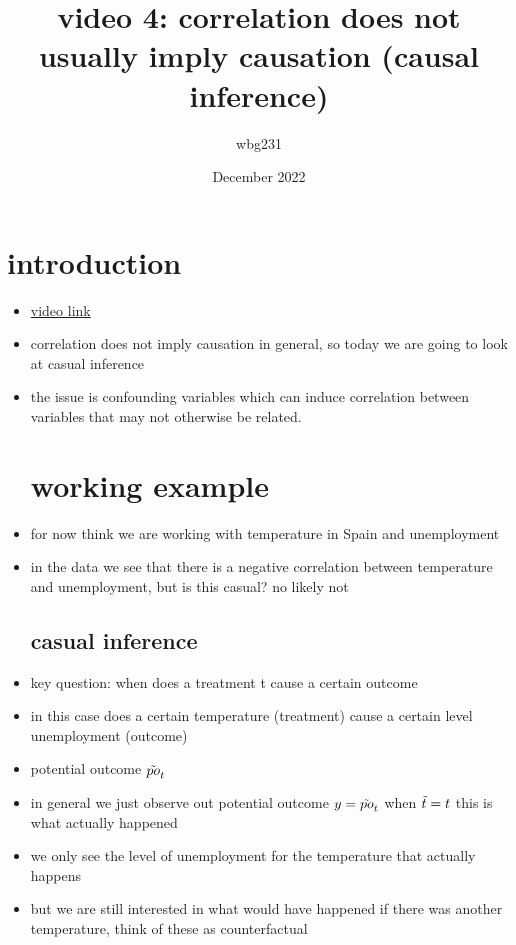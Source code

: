 \documentclass{article}
\title{video 4: correlation does not usually imply causation (causal inference)}
\author{wbg231 }
\date{December 2022}
\begin{document}
\maketitle

\section{introduction}
\begin{itemize}
\item \href{https://www.youtube.com/watch?v=dVAGPmiF3E0}{video link}
\item correlation does not imply causation in general, so today we are going to look at casual inference 
\item the issue is confounding variables which can induce correlation between variables that may not otherwise be related. 
\section{working example}
\item for now think we are working with temperature in Spain and unemployment 
\item in the data we see that there is a negative correlation between temperature and unemployment, but is this casual? no likely not
\subsection{ casual inference}
\item key question: when does a treatment t cause a certain outcome
\item in this case does a certain temperature (treatment) cause a certain level unemployment (outcome)
\item potential outcome $\Tilde{po}_{t}$
\item in general we just observe out potential outcome $y=\Tilde{po}_{t}$ when $\Tilde{t}=t$ this is what actually happened 
\item we only see the level of unemployment for the temperature that actually happens 
\item but we are still interested in what would have happened if there was another temperature, think of these as counterfactual

\end{itemize}
\end{document}
